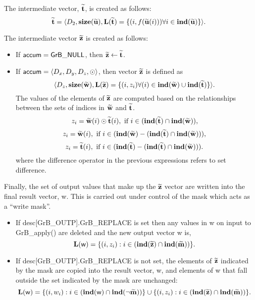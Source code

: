 The intermediate vector, ${\bf \widetilde{t}}$, is created as follows:
\[ 
{\bf \widetilde{t}} = \langle
D_2, \bold{size}({\bf \widetilde{u}}),
\bold{L}({\bf \widetilde{t}}) =
\{(i,f({\bf \widetilde{u}}(i))) \forall i \in \bold{ind}({\bf \widetilde{u}}) \} \rangle. 
\]

The intermediate vector ${\bf \widetilde{z}}$ is created as follows:
\begin{itemize}
    \item If ${\sf accum} = {\sf GrB\_NULL}$, then ${\bf \widetilde{z}} \leftarrow {\bf \widetilde{t}}$.

    \item If ${\sf accum} = \langle D_x, D_y, D_z, \odot \rangle$, then vector ${\bf \widetilde{z}}$ is defined as 
        \[ \langle D_z, \bold{size}({\bf \widetilde{w}}), \bold{L}({\bf \widetilde{z}})
		= \{(i,z_{i})  \forall (i) \in \bold{ind}({\bf \widetilde{w}}) \cup 
        \bold{ind}({\bf \widetilde{t}}) \} \rangle.\]
    The values of the elements of ${\bf \widetilde{z}}$ are computed based on the relationships between the sets of indices in ${\bf \widetilde{w}}$ and ${\bf \widetilde{t}}$.
\[
z_{i} = {\bf \widetilde{w}}(i) \odot {\bf \widetilde{t}}(i), \mbox{~if~} i \in  (\bold{ind}({\bf \widetilde{t}}) \cap \bold{ind}({\bf \widetilde{w}})),
\]
\[
z_{i} = {\bf \widetilde{w}}(i), \mbox{~if~}  i \in  (\bold{ind}({\bf \widetilde{w}}) - (\bold{ind}({\bf \widetilde{t}}) \cap \bold{ind}({\bf \widetilde{w}}))),
\]
\[
z_{i} = {\bf \widetilde{t}}(i), \mbox{~if~}  i \in  (\bold{ind}({\bf \widetilde{t}}) - (\bold{ind}({\bf \widetilde{t}}) \cap \bold{ind}({\bf \widetilde{w}}))).
\]
where the difference operator in the previous expressions refers to set difference.
\end{itemize}

Finally, the set of output values that make up the ${\bf \widetilde{z}}$ 
vector are written into the final result vector, {\sf w}. 
This is carried out under control of the mask which acts as a ``write mask''.
\begin{itemize}
\item If {\sf desc[GrB\_OUTP].GrB\_REPLACE} is set then any values in {\sf w} 
on input to {\sf GrB\_apply()} are deleted and the new output vector {\sf w} is,
\[ \bold{L}({\sf w}) = \{(i,z_{i}) : i \in (\bold{ind}({\bf \widetilde{z}}) 
\cap \bold{ind}({\bf \widetilde{m}})) \}. \]

\item If {\sf desc[GrB\_OUTP].GrB\_REPLACE} is not set, the elements of 
${\bf \widetilde{z}}$ indicated by 
the mask are copied into the result vector, {\sf w}, and elements of 
{\sf w} that fall outside the set indicated by the mask are unchanged:
\[ \bold{L}({\sf w}) = \{(i,w_{i}) : i \in (\bold{ind}({\sf w}) 
\cap \bold{ind}(\neg {\bf \widetilde{m}})) \} \cup \{(i,z_{i}) : i \in 
(\bold{ind}({\bf \widetilde{z}}) \cap \bold{ind}({\bf \widetilde{m}})) \}. \]
\end{itemize}

